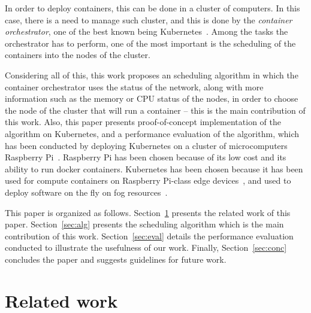 \documentclass[conference]{IEEEtran}
\begin{document}
In order to deploy containers, this can be done in a cluster of computers. In this case, there is a need to manage such cluster, and this is done by the \emph{container orchestrator}, one of the best known being Kubernetes~\cite{Bernstein14b}. Among the tasks the orchestrator has to perform, one of the most important is the scheduling of the containers into the nodes of the cluster.


Considering all of this, this work proposes an scheduling algorithm in which the container orchestrator uses the status of the network, along with more information such as the memory or CPU status of the nodes, in order to choose the node of the cluster that will run a container -- this is the main contribution of this work. 
Also, this paper presents proof-of-concept implementation of the algorithm on Kubernetes, and a performance evaluation of the algorithm, which has been conducted by deploying Kubernetes on a cluster of microcomputers Raspberry Pi~\cite{VujovicM15}. Raspberry Pi has been chosen because of its low cost and its ability to run docker containers. Kubernetes has been chosen because it has been used for compute containers on Raspberry Pi-class edge devices~\cite{Tsai17}, and used to deploy software on the fly on fog resources~\cite{Hong16}. 

This paper is organized as follows. Section~\ref{sec:rel} presents the related work of this paper. Section~\ref{sec:alg} presents the scheduling algorithm which is the main contribution of this work. Section~\ref{sec:eval} details the performance evaluation conducted to illustrate the usefulness of our work. Finally, Section~\ref{sec:conc} concludes the paper and suggests guidelines for future work. 

\section{Related work}\label{sec:rel}
\end{document}
